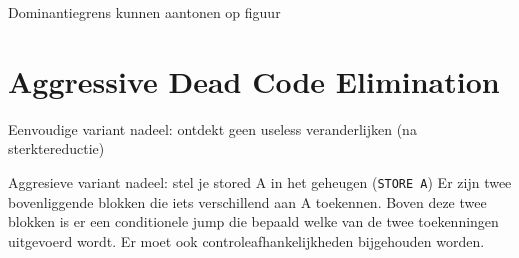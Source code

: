 Dominantiegrens kunnen aantonen op figuur


\section{Aggressive Dead Code Elimination}
Eenvoudige variant nadeel: ontdekt geen useless veranderlijken (na sterktereductie)

Aggresieve variant nadeel: stel je stored A in het geheugen (\texttt{STORE A}) Er zijn twee bovenliggende blokken die iets verschillend aan A toekennen. Boven deze twee blokken is er een conditionele jump die bepaald welke van de twee toekenningen uitgevoerd wordt. Er moet ook controleafhankelijkheden bijgehouden worden.